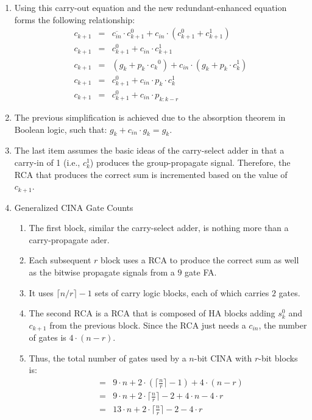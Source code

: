 \documentclass[times, twocolumn, 10pt]{article}
\begin{document}
\begin{enumerate}
\begin{enumerate}
\item Using this carry-out equation and the new redundant-enhanced equation
  forms the following relationship:
\begin{eqnarray*}
c_{k+1} & = & \overline{c_{in}} \cdot c_{k+1}^0 + c_{in} \cdot (c_{k+1}^0 +
    c_{k+1}^1) \\
c_{k+1} & = & c_{k+1}^0 + c_{in} \cdot c_{k+1}^1 \\
c_{k+1} & = & (g_k + p_k \cdot {c_k}^0) + c_{in} \cdot (g_k + p_k \cdot c_k^1)
    \\
c_{k+1} & = & c_{k+1}^0 + c_{in} \cdot p_k \cdot c_k^1 \\
c_{k+1} & = & c_{k+1}^0 + c_{in} \cdot p_{k:k-r}
\end{eqnarray*}
\item The previous simplification is achieved due to the absorption theorem in Boolean logic, such that:  $g_k + c_{in} \cdot g_k = g_k$.
\item The last item assumes the basic ideas of the carry-select adder in that
  a carry-in of 1 (i.e., $c_k^1$) produces the group-propagate signal.
  Therefore, the RCA that produces the correct sum is incremented based on
  the value of $c_{k+1}$.
\item Generalized CINA Gate Counts
\begin{enumerate}
\item The first block, similar the carry-select adder, is nothing more than a
  carry-propagate ader.
\item Each subsequent $r$ block uses a RCA to produce the correct sum as well
  as the bitwise propagate signals from a $9$ gate FA.
\item It uses $\lceil n/r \rceil - 1$ sets of carry logic blocks, each of
  which carries $2$ gates.
\item The second RCA is a RCA that is composed of HA blocks adding $s_k^0$
  and $c_{k+1}$ from the previous block.  Since the RCA just needs a $c_{in}$,
  the number of gates is $4 \cdot (n - r)$.
\item Thus, the total number of gates used by a $n$-bit CINA with $r$-bit
  blocks is:
\begin{eqnarray*}
  & = & 9 \cdot n + 2 \cdot \left( \lceil \frac{n}{r} \rceil -1
  \right) + 4 \cdot (n - r) \\
  & = & 9 \cdot n + 2 \cdot \lceil \frac{n}{r} \rceil - 2 + 4 \cdot n
  - 4 \cdot r \\
  & = & 13 \cdot n + 2 \cdot \lceil \frac{n}{r} \rceil - 2 - 4 \cdot r
\end{eqnarray*}

\end{enumerate}
\end{enumerate}
\end{enumerate}
\end{document}
